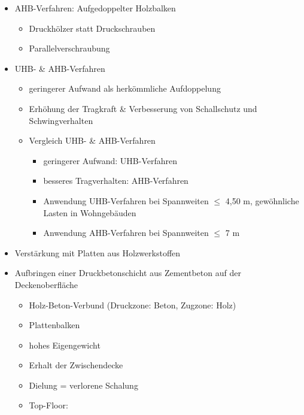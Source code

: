 \documentclass[fleqn,twoside,dvipsnames]{article}
\begin{document}
\begin{itemize}
\begin{itemize}
                \end{itemize}
            \item AHB-Verfahren: Aufgedoppelter Holzbalken
                \begin{itemize}
                    \item Druckhölzer statt Druckschrauben
                    \item Parallelverschraubung
                \end{itemize}
            \item UHB- \& AHB-Verfahren
                \begin{itemize}
                    \item geringerer Aufwand als herkömmliche Aufdoppelung
                    \item Erhöhung der Tragkraft \& Verbesserung von Schallschutz und Schwingverhalten
                    \item Vergleich UHB- \& AHB-Verfahren
                        \begin{itemize}
                            \item geringerer Aufwand: UHB-Verfahren
                            \item besseres Tragverhalten: AHB-Verfahren
                            \item Anwendung UHB-Verfahren bei Spannweiten $\leq$ 4,50 m, gewöhnliche Lasten in Wohngebäuden
                            \item Anwendung AHB-Verfahren bei Spannweiten $\leq$ 7 m
                        \end{itemize}
                \end{itemize}
            \item Verstärkung mit Platten aus Holzwerkstoffen
            \item Aufbringen einer Druckbetonschicht aus Zementbeton auf der Deckenoberfläche \label{holz-Beton}
                \begin{itemize}
                    \item Holz-Beton-Verbund (Druckzone: Beton, Zugzone: Holz)
                    \item Plattenbalken
                    \item hohes Eigengewicht
                    \item Erhalt der Zwischendecke
                    \item Dielung = verlorene Schalung
                    \item Top-Floor:

\end{itemize}
\end{itemize}
\end{document}
